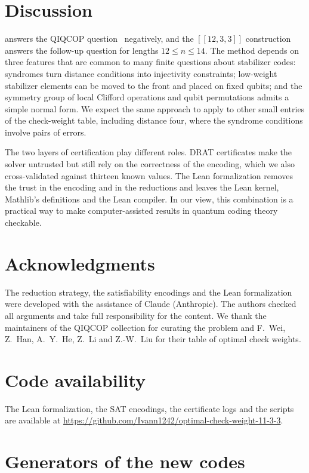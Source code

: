 \documentclass[a4paper,onecolumn,unpublished]{quantumarticle}
\theoremstyle{definition}
\theoremstyle{remark}
\newcommand{\qc}[1]{[\![#1]\!]}
\begin{document}
\section{Discussion}
\label{sec:discussion}

 answers the QIQCOP question~\cite{QIQCOP} negatively, and the $\qc{12,3,3}$
construction answers the follow-up question for lengths $12\le n\le14$. The method depends on
three features that are common to many finite questions about stabilizer codes: syndromes turn
distance conditions into injectivity constraints; low-weight stabilizer elements can be moved to
the front and placed on fixed qubits; and the symmetry group of local Clifford operations and qubit
permutations admits a simple normal form. We expect the same approach to apply to other small
entries of the check-weight table, including distance four, where the syndrome conditions involve
pairs of errors.

The two layers of certification play different roles. DRAT certificates make the solver
untrusted but still rely on the correctness of the encoding, which we also cross-validated against
thirteen known values. The Lean formalization removes the trust in the encoding and in the
reductions and leaves the Lean kernel, Mathlib's definitions and the Lean compiler. In our view,
this combination is a practical way to make computer-assisted results in quantum coding theory
checkable.

\section*{Acknowledgments}
The reduction strategy, the satisfiability encodings and the Lean formalization were developed with
the assistance of Claude (Anthropic). The authors checked all arguments and take full
responsibility for the content. We thank the maintainers of the QIQCOP collection for curating the
problem and F.~Wei, Z.~Han, A.~Y.~He, Z.~Li and Z.-W.~Liu for their table of optimal check
weights.

\section*{Code availability}
The Lean formalization, the SAT encodings, the certificate logs and the scripts are available at
\url{https://github.com/Ivann1242/optimal-check-weight-11-3-3}.

\appendix
\section{Generators of the new codes}
\label{app:codes}
\end{document}
